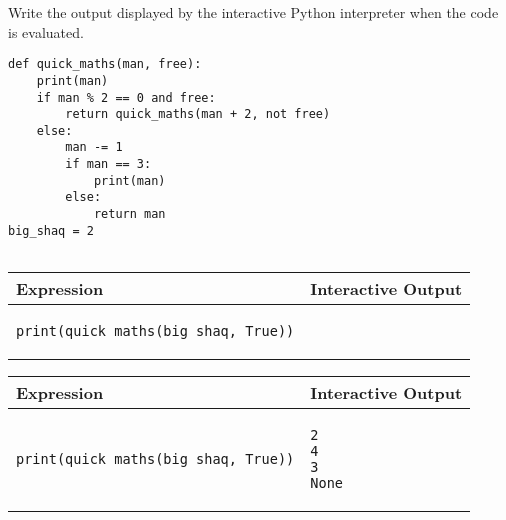 \begin{blocksection}
\question Write the output displayed by the interactive Python interpreter when the code is evaluated. \\


\begin{lstlisting}
def quick_maths(man, free):    
    print(man)
    if man % 2 == 0 and free:
        return quick_maths(man + 2, not free)
    else:
        man -= 1
        if man == 3:
            print(man)
        else:
            return man
big_shaq = 2
    
\end{lstlisting}

\begin{center}
\begin{tabular}{|p{10cm}|p{5cm}|} 
\hline
\textbf{Expression} & \textbf{Interactive Output} \\ 
\hline
\rule{0pt}{3ex}
\begin{lstlisting}
print(quick_maths(big_shaq, True))
\end{lstlisting}
&  \\ 
\hline
\end{tabular}
\end{center}


\begin{solution}[1.5in]
\begin{center}
\begin{tabular}{|p{8cm}|p{6cm}|} 
\hline
\textbf{Expression} & \textbf{Interactive Output} \\ 
\hline
\rule{0pt}{4ex}
\begin{lstlisting}
print(quick_maths(big_shaq, True))
\end{lstlisting}
&  
\begin{lstlisting}
2
4
3
None
\end{lstlisting}\\ 
\hline
\end{tabular}
\end{center}

\end{solution}
\end{blocksection}
